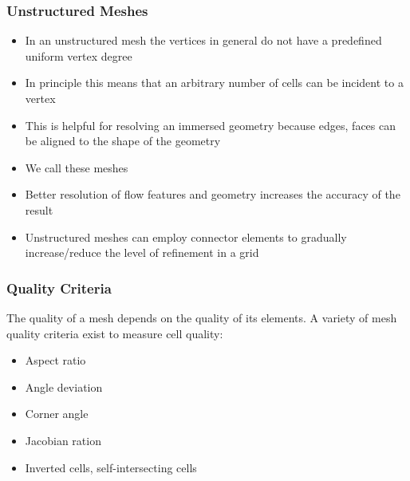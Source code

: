\begin{frame}
\frametitle{Unstructured Meshes}
\begin{itemize}
\item In an unstructured mesh the vertices in general do not have a predefined uniform vertex degree
\item In principle this means that an arbitrary number of cells can be incident to a vertex
\item This is helpful for resolving an immersed geometry because edges, faces can be aligned to the shape of the geometry
\item We call these meshes 
\item Better resolution of flow features and geometry increases the accuracy of the result
\item Unstructured meshes can employ connector elements to gradually increase/reduce the level of refinement in a grid
\end{itemize}
\end{frame}

\begin{frame}
\frametitle{Quality Criteria}
The quality of a mesh depends on the quality of its elements. A variety of mesh quality criteria \cite{kellyansys} exist to measure cell quality:
\begin{itemize}
\item Aspect ratio
\item Angle deviation
\item Corner angle
\item Jacobian ration
\item Inverted cells, self-intersecting cells
\end{itemize}
\end{frame}

\begin{frame}
\begin{figure}[h!]
  \centering
  \\
\end{figure}
\end{frame}

